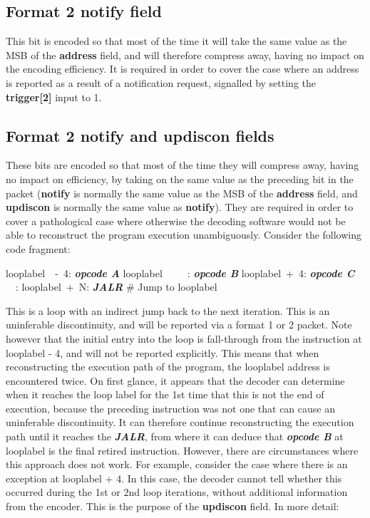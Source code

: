 \subsection{Format 2 \textbf{notify} field} \label{sec:notify}

This bit is encoded so that most of the time it will take the same value as the MSB of the \textbf{address} field,
and will therefore compress away, having no impact on the encoding efficiency.  It is required in order to cover 
the case where an address is reported as a result of a notification request, signalled by setting the 
\textbf{trigger[2]} input to 1. 


\subsection{Format 2 \textbf{notify} and \textbf{updiscon} fields} \label{sec:updiscon}

These bits are encoded so that most of the time they will compress away, having no impact on efficiency, by taking on 
the same value as the preceding bit in the packet (\textbf{notify} is normally the same value as the MSB of the 
\textbf{address} field, and \textbf{updiscon} is normally the same value as \textbf{notify}).  They are required in
order to cover a pathological case where otherwise the decoding software would not be able to reconstruct the program 
execution unambiguously. Consider the following code fragment:

looplabel~~-~4: \textbf{\textit{opcode A}} \newline
looplabel~~~~~: \textbf{\textit{opcode B}} \newline
looplabel~+~4: \textbf{\textit{opcode C}} \newline
~~: \newline
looplabel~+~N: \textbf{\textit{JALR}} \# Jump to looplabel\newline

This is a loop with an indirect jump back to the next iteration.  This is an uninferable discontinuity, and will be
reported via a format 1 or 2 packet.  Note however that the initial entry into the loop is fall-through from the
instruction at looplabel - 4, and will not be reported explicitly.  This means that when reconstructing the execution 
path of the program, the looplabel address is encountered twice.  On first glance, it appears that the decoder can determine
when it reaches the loop label for the 1st time that this is not the end of execution, because the preceding
instruction was not one that can cause an uninferable discontinuity.  It can therefore continue reconstructing the 
execution path until it reaches the \textbf{\textit{JALR}}, from where it can deduce that \textbf{\textit{opcode B}} at
looplabel is the final retired instruction.  However, there are circumstances where this approach 
does not work.  For example, consider the case where there is an exception at looplabel + 4.  In this case, the decoder
cannot tell whether this occurred during the 1st or 2nd loop iterations, without additional information from the 
encoder.  This is the purpose of the \textbf{updiscon} field.  In more detail:

